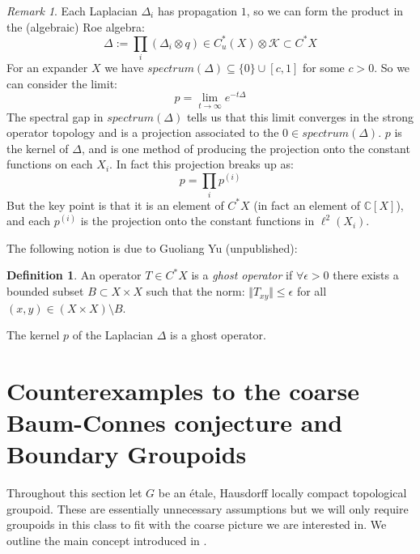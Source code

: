 \documentclass[11pt]{amsart}
\theoremstyle{plain}
\theoremstyle{definition}%
\newtheorem{definition}[theorem]{Definition}%
\theoremstyle{remark}%
\newtheorem{remark}[theorem]{Remark}%
\begin{document}
\begin{remark}\label{Rem:Ghost}
Each Laplacian $\Delta_{i}$ has propagation $1$, so we can form the product in the (algebraic) Roe algebra:
\begin{equation*}
\Delta:=\prod_{i}(\Delta_{i} \otimes q) \in C^{*}_{u}(X)\otimes \mathcal{K} \subset C^{*}X
\end{equation*}
For an expander $X$ we have $spectrum(\Delta) \subseteq \lbrace 0 \rbrace \cup [c,1]$ for some $c>0$. So we can consider the limit:
\begin{equation*}
p = \lim_{t \rightarrow \infty}e^{-t\Delta}
\end{equation*}
The spectral gap in $spectrum(\Delta)$ tells us that this limit converges in the strong operator topology and is a projection associated to the $0 \in spectrum(\Delta)$. $p$ is the kernel of $\Delta$, and is one method of producing the projection onto the constant functions on each $X_{i}$. In fact this projection breaks up as:
\begin{equation*}
p=\prod_{i}p^{(i)}
\end{equation*}
But the key point is that it is an element of $C^{*}X$ (in fact an element of $\mathbb{C}[X]$), and each $p^{(i)}$ is the projection onto the constant functions in $\ell^{2}(X_{i})$. 
\end{remark}
The following notion is due to Guoliang Yu (unpublished):

\begin{definition}\label{Def:Ghost}
An operator $T \in C^{*}X$ is a \textit{ghost operator} if $\forall \epsilon >0$ there exists a bounded subset $B \subset X\times X$ such that the norm: $\Vert T_{xy} \Vert \leq \epsilon$ for all $(x,y) \in (X\times X) \setminus B$.
\end{definition}

The kernel $p$ of the Laplacian $\Delta$ is a ghost operator.

\section{Counterexamples to the coarse Baum-Connes conjecture and Boundary Groupoids}\label{Sect:CE}

Throughout this section let $G$ be an \'etale, Hausdorff locally compact topological groupoid. These are essentially unnecessary assumptions but we will only require groupoids in this class to fit with the coarse picture we are interested in. We outline the main concept introduced in \cite{MR1911663}. 
\end{document}
